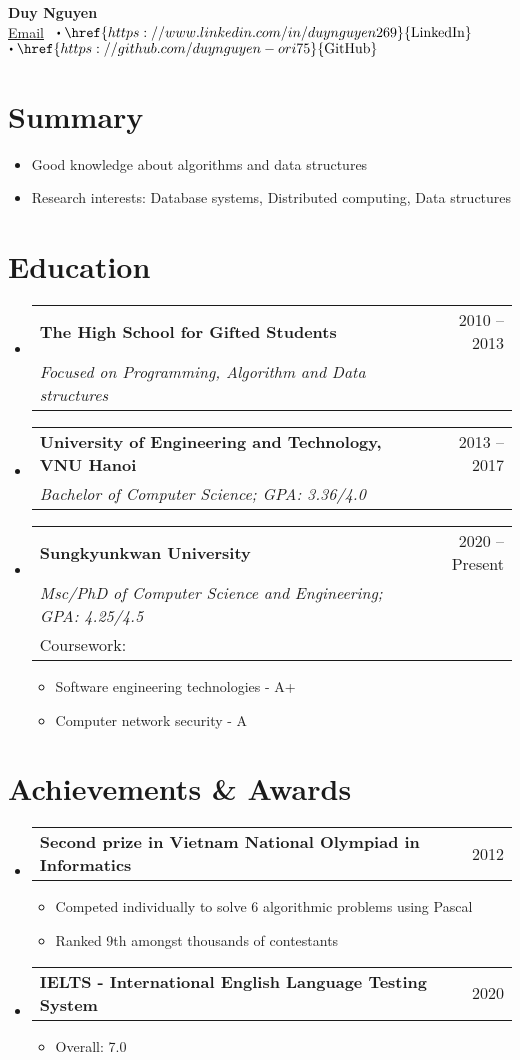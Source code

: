 \documentclass[a4paper,11pt]{article}
\makeatletter
\newcommand{\resumeItem}[1]{
  \item\small{
    {#1 \vspace{-2pt}}
  }
}
\newcommand{\resumeSubheadTwo}[2]{
  \vspace{-1pt}\item
    \begin{tabular*}{0.97\textwidth}{l@{\extracolsep{\fill}}r}
      \textbf{#1} & #2
    \end{tabular*}\vspace{-5pt}
}
\newcommand{\resumeSubhead}[3]{
  \vspace{-1pt}\item
    \begin{tabular*}{0.97\textwidth}{l@{\extracolsep{\fill}}r}
      \textbf{#1} & #2 \\
      \textit{\normalsize#3}
    \end{tabular*}\vspace{-5pt}
}
\newcommand{\resumeSubheadThree}[4]{
  \vspace{-1pt}\item
    \begin{tabular*}{0.97\textwidth}{l@{\extracolsep{\fill}}r}
      \textbf{#1} & #2 \\
      \textit{\normalsize#3} \\
      \normalsize#4
    \end{tabular*}\vspace{-5pt}
}
\newcommand{\link}[2]{{\href{#1}{\textrm{#2}}}}
\newcommand\sbullet[1][.5]{\mathbin{\vcenter{\hbox{\scalebox{#1}{$\bullet$}}}}}
\newcommand{\resumeSubHeadingListStart}{\begin{itemize}[leftmargin=*]}
\newcommand{\resumeSubHeadingListEnd}{\end{itemize}}
\newcommand{\resumeItemListStart}{\begin{itemize}}
\newcommand{\resumeItemListEnd}{\end{itemize}\vspace{-5pt}}
\makeatother
\begin{document}
\begin{center}
    \textbf{\huge Duy Nguyen} \\
    \medskip
    \link{mailto:duynguyen.ori75@gmail.com}{Email} \,
    $\sbullet \;\link{https://www.linkedin.com/in/duynguyen269}{LinkedIn} $ \,
    $\sbullet \;\link{https://github.com/duynguyen-ori75}{GitHub} $
\end{center}

\section{Summary}
  \resumeItemListStart
    \resumeItem{Good knowledge about algorithms and data structures}
    \resumeItem{Research interests: Database systems, Distributed computing, Data structures}
  \resumeItemListEnd

\section{Education}
  \resumeSubHeadingListStart
    \resumeSubhead
      {The High School for Gifted Students}{2010 -- 2013}
      {Focused on Programming, Algorithm and Data structures}
    \resumeSubhead
      {University of Engineering and Technology, VNU Hanoi}{2013 -- 2017}
      {Bachelor of Computer Science; GPA: 3.36/4.0}
    \resumeSubheadThree
      {Sungkyunkwan University}{2020 -- Present}
      {Msc/PhD of Computer Science and Engineering; GPA: 4.25/4.5}
      {Coursework:}
      \resumeItemListStart
        \resumeItem{Software engineering technologies - A+}
        \resumeItem{Computer network security - A}
      \resumeItemListEnd
  \resumeSubHeadingListEnd

\section{Achievements \& Awards}
  \resumeSubHeadingListStart
    \resumeSubheadTwo
      {Second prize in Vietnam National Olympiad in Informatics}{2012}
      \resumeItemListStart
        \resumeItem{Competed individually to solve 6 algorithmic problems using Pascal}
        \resumeItem{Ranked 9th amongst thousands of contestants}
      \resumeItemListEnd
    \resumeSubheadTwo
      {IELTS - International English Language Testing System}{2020}
      \resumeItemListStart
        \resumeItem{Overall: 7.0}
      \resumeItemListEnd
  \resumeSubHeadingListEnd
\end{document}

